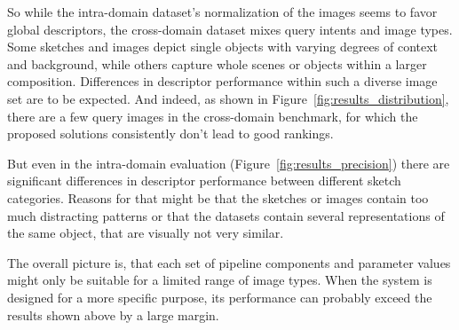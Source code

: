 So while the intra-domain dataset's normalization of the images seems to favor
global descriptors, the cross-domain dataset mixes query intents and image
types. Some sketches and images depict single objects with varying degrees of
context and background, while others capture whole scenes or objects within a
larger composition. Differences in descriptor performance within such a diverse
image set are to be expected. And indeed, as shown in
Figure~\ref{fig:results_distribution}, there are a few query images in the
cross-domain benchmark, for which the proposed solutions consistently don't
lead to good rankings. 

But even in the intra-domain evaluation (Figure~\ref{fig:results_precision})
there are significant differences in descriptor performance between different
sketch categories. Reasons for that might be that the sketches or images
contain too much distracting patterns or that the datasets contain several
representations of the same object, that are visually not very similar. 

The overall picture is, that each set of pipeline components and parameter
values might only be suitable for a limited range of image types. When the
system is designed for a more specific purpose, its performance can probably
exceed the results shown above by a large margin.
